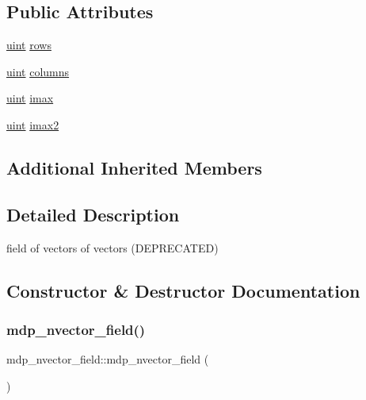 \subsection*{Public Attributes}
\begin{DoxyCompactItemize}
\item 
\hyperlink{mdp__global__vars_8h_a91ad9478d81a7aaf2593e8d9c3d06a14}{uint} \hyperlink{classmdp__nvector__field_a8938e7e300995ed6733a2c405a80cfb3}{rows}
\item 
\hyperlink{mdp__global__vars_8h_a91ad9478d81a7aaf2593e8d9c3d06a14}{uint} \hyperlink{classmdp__nvector__field_a796e400fc808b5271faa95abb27ded15}{columns}
\item 
\hyperlink{mdp__global__vars_8h_a91ad9478d81a7aaf2593e8d9c3d06a14}{uint} \hyperlink{classmdp__nvector__field_a7c183e06584fdf73fedf889ef1186cdd}{imax}
\item 
\hyperlink{mdp__global__vars_8h_a91ad9478d81a7aaf2593e8d9c3d06a14}{uint} \hyperlink{classmdp__nvector__field_ac123ef55f792faa34a2429853f7872f6}{imax2}
\end{DoxyCompactItemize}
\subsection*{Additional Inherited Members}


\subsection{Detailed Description}
field of vectors of vectors (D\+E\+P\+R\+E\+C\+A\+T\+ED) 

\subsection{Constructor \& Destructor Documentation}
\mbox{\label{classmdp__nvector__field_a528129f314282511fa8b910c09872972}} 
\subsubsection{\texorpdfstring{mdp\+\_\+nvector\+\_\+field()}{mdp\_nvector\_field()}\hspace{0.1cm}{\footnotesize\ttfamily [1/3]}}
{\footnotesize\ttfamily mdp\+\_\+nvector\+\_\+field\+::mdp\+\_\+nvector\+\_\+field (\begin{DoxyParamCaption}{ }\end{DoxyParamCaption})\hspace{0.3cm}{\ttfamily [inline]}}

